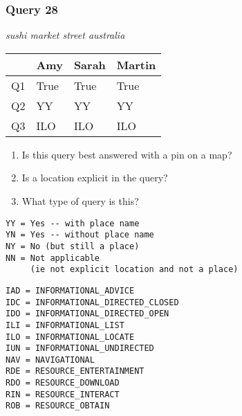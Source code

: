 \begin{frame}[fragile]
\frametitle{Query 28}
\vspace{1em}

\emph{sushi market street australia}

\vfill

\begin{table}
  \centering
  \begin{tabular}{ l l l l }
    & \textbf{Amy} & \textbf{Sarah} & \textbf{Martin}\\
    \toprule
    Q1 & True & True & True\\
Q2 & YY & YY & YY\\
Q3 & ILO & ILO & ILO\\
    \bottomrule
  \end{tabular}
\end{table}

\vfill

\tiny{

\begin{enumerate}
\item Is this query best answered with a pin on a map?
\item Is a location explicit in the query?
\item What type of query is this?
\end{enumerate}

\vfill

\begin{multicols}{2}
\begin{verbatim}
YY = Yes -- with place name
YN = Yes -- without place name
NY = No (but still a place)
NN = Not applicable 
     (ie not explicit location and not a place)
\end{verbatim}

\columnbreak
\begin{verbatim}
IAD = INFORMATIONAL_ADVICE
IDC = INFORMATIONAL_DIRECTED_CLOSED
IDO = INFORMATIONAL_DIRECTED_OPEN
ILI = INFORMATIONAL_LIST
ILO = INFORMATIONAL_LOCATE
IUN = INFORMATIONAL_UNDIRECTED
NAV = NAVIGATIONAL
RDE = RESOURCE_ENTERTAINMENT
RDO = RESOURCE_DOWNLOAD
RIN = RESOURCE_INTERACT
ROB = RESOURCE_OBTAIN
\end{verbatim}
\end{multicols}
}

\end{frame}


